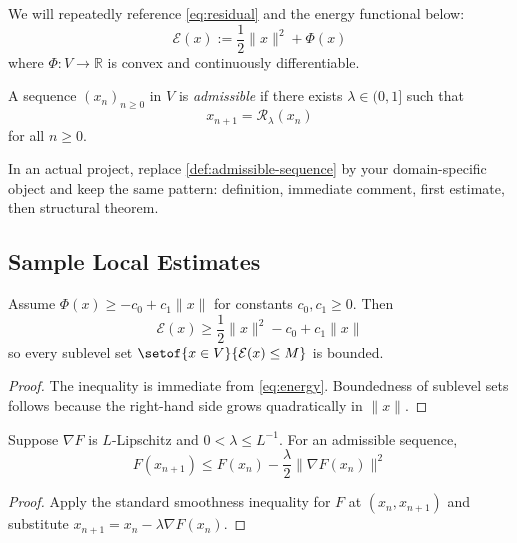 We will repeatedly reference \cref{eq:residual} and the energy functional below:
\begin{equation}
\label{eq:energy}
\mathcal{E}(x):=\frac12\|x\|^2+\Phi(x)
\end{equation}
where $\Phi:V\to\mathbb{R}$ is convex and continuously differentiable.

\begin{definition}
\label{def:admissible-sequence}
A sequence $(x_n)_{n\ge 0}$ in $V$ is \emph{admissible} if there exists $\lambda\in(0,1]$ such that
\[
x_{n+1}=\mathcal{R}_\lambda(x_n)
\]
for all $n\ge 0$.
\end{definition}

\begin{remark}
\label{rem:adapt-model}
In an actual project, replace \cref{def:admissible-sequence} by your domain-specific object and keep the same pattern: definition, immediate comment, first estimate, then structural theorem.
\end{remark}

\subsection{Sample Local Estimates}
\label{ssec:local-estimates}

\begin{lemma}
\label{lem:coercive-bound}
Assume $\Phi(x)\ge -c_0+c_1\|x\|$ for constants $c_0,c_1\ge 0$. Then
\[
\mathcal{E}(x)\ge \frac12\|x\|^2-c_0+c_1\|x\|
\]
so every sublevel set $\setof{x\in V}{\mathcal{E}(x)\le M}$ is bounded.
\end{lemma}

\begin{proof}
The inequality is immediate from \cref{eq:energy}. Boundedness of sublevel sets follows because the right-hand side grows quadratically in $\|x\|$.
\end{proof}

\begin{proposition}
\label{prop:descent}
Suppose $\nabla F$ is $L$-Lipschitz and $0<\lambda\le L^{-1}$. For an admissible sequence,
\begin{equation}
\label{eq:descent}
F(x_{n+1})\le F(x_n)-\frac{\lambda}{2}\|\nabla F(x_n)\|^2
\end{equation}
\end{proposition}

\begin{proof}
Apply the standard smoothness inequality for $F$ at $(x_n,x_{n+1})$ and substitute $x_{n+1}=x_n-\lambda\nabla F(x_n)$.
\end{proof}

